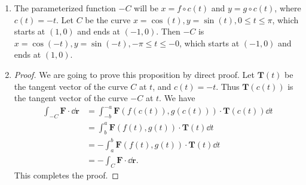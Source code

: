 \documentclass[8pt,twocolumn]{article}
\begin{document}
\begin{Answer}[number=37]
  \begin{enumerate}
    \item The parameterized function $-C$ will be $x=f\circ c (t)$ and $y =
      g\circ c (t)$, where $c(t) = -t$. Let $C$ be the curve $x=\cos(t),
      y=\sin(t), 0\le t\le \pi$, which starts at $(1,0)$ and ends at $(-1,0)$.
      Then $-C$ is $x=\cos(-t), y=\sin(-t), -\pi \le t\le -0$, which starts at
      $(-1,0)$ and ends at $(1,0)$.

    \item \begin{proof}
        We are going to prove this proposition by direct proof. Let $\bm{T}(t)$
        be the tangent vector of the curve $C$ at $t$, and $c(t) = -t$. Thus
        $\bm{T}(c(t))$ is the tangent vector of the curve $-C$ at $t$. We have
        \begin{align*}
          \int_{-C} \bm{F}\cdot \dd{\bm{r}} &= \int_{-b}^{-a} \bm{F}(f(c(t)),
          g(c(t))) \cdot \bm{T}(c(t)) \dd{t} \\
          &= \int_{b}^{a} \bm{F}(f(t), g(t)) \cdot \bm{T}(t) \dd{t} \\
          &= -\int_{a}^{b} \bm{F}(f(t), g(t)) \cdot \bm{T}(t) \dd{t} \\
          &= -\int_C \bm{F}\cdot \dd{\bm{r}}.
        \end{align*}
        This completes the proof.
    \end{proof}
  \end{enumerate}
\end{Answer}
\end{document}
